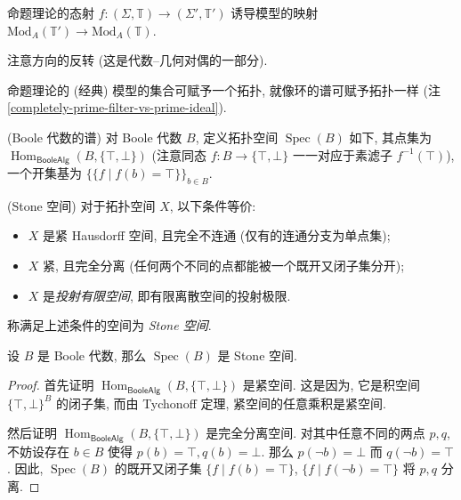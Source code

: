\begin{prop}
	{}
	命题理论的态射 $f\colon (\Sigma,\mathbb T) \to (\Sigma',\mathbb T')$ 诱导模型的映射 $\text{Mod}_A(\mathbb T') \to \text{Mod}_A(\mathbb T)$.
\end{prop}

注意方向的反转 (这是代数--几何对偶的一部分).

命题理论的 (经典) 模型的集合可赋予一个拓扑, 就像环的谱可赋予拓扑一样 (注 \ref{completely-prime-filter-vs-prime-ideal}).

\begin{definition}
	{(Boole 代数的谱)}
	对 Boole 代数 $B$, 定义拓扑空间 $\operatorname{Spec}(B)$ 如下, 其点集为 $\operatorname{Hom}_{\mathsf {BooleAlg}}(B,\{\top,\bot\})$ (注意同态 $f\colon B\to\{\top,\bot\}$ 一一对应于素滤子 $f^{-1}(\top)$), 一个开集基为 $\big\{\{f\mid f(b)=\top\}\big\}_{b\in B}$.
\end{definition}

\begin{propdef}
	{(Stone 空间)}
	对于拓扑空间 $X$, 以下条件等价:
	\begin{itemize}
		\item $X$ 是紧 Hausdorff 空间, 且完全不连通 (仅有的连通分支为单点集);
		\item $X$ 紧, 且完全分离 (任何两个不同的点都能被一个既开又闭子集分开);
		\item $X$ 是\emph{投射有限空间}, 即有限离散空间的投射极限.
	\end{itemize}
	称满足上述条件的空间为 \emph{Stone 空间}.
\end{propdef}

\begin{prop}
	{}
	设 $B$ 是 Boole 代数, 那么 $\operatorname{Spec}(B)$ 是 Stone 空间.
\end{prop}

\begin{proof}
	首先证明 $\operatorname{Hom}_{\mathsf {BooleAlg}}(B,\{\top,\bot\})$ 是紧空间. 这是因为, 它是积空间 $\{\top,\bot\}^{B}$ 的闭子集, 而由 Tychonoff 定理, 紧空间的任意乘积是紧空间.%
	
	然后证明 $\operatorname{Hom}_{\mathsf {BooleAlg}}(B,\{\top,\bot\})$ 是完全分离空间. 对其中任意不同的两点 $p,q$,
	不妨设存在 $b\in B$ 使得 $p(b)=\top,q(b)=\bot$.
	那么 $p(\neg b)=\bot$ 而 $q(\neg b)=\top$.
	因此, $\operatorname{Spec}(B)$ 的既开又闭子集
	$\{f\mid f(b)=\top\}$, $\{f\mid f(\neg b)=\top\}$ 将 $p,q$ 分离.
\end{proof}

